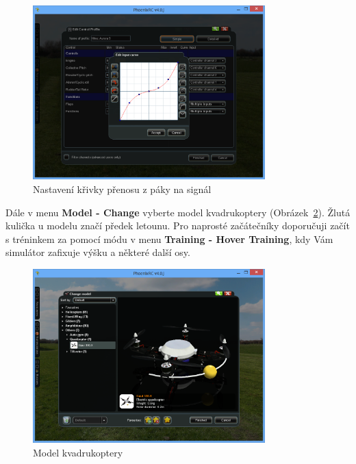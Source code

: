 \documentclass[11pt, a4paper]{article}
\begin{document}
\begin{figure}[h]
\begin{center}
\includegraphics[width=0.8\textwidth]{fig/11.PNG}
\caption{Nastavení křivky přenosu z páky na signál}
\label{fig:obr11}
\end{center}
\end{figure}

Dále v menu \textbf{Model - Change} vyberte model kvadrukoptery (Obrázek~\ref{fig:obr12}). Žlutá kulička u modelu značí předek letounu. Pro naprosté začátečníky doporučuji začít s tréninkem za pomocí módu v menu \textbf{Training - Hover Training}, kdy Vám simulátor zafixuje výšku a některé další osy.

\begin{figure}[h]
\begin{center}
\includegraphics[width=0.8\textwidth]{fig/13.PNG}
\caption{Model kvadrukoptery}
\label{fig:obr12}
\end{center}
\end{figure}
\end{document}
